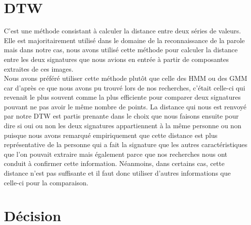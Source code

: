 \documentclass[pdftex,12pt,a4paper]{report}
\begin{document}
\newpage

\chapter{DTW}
C'est une méthode consistant à calculer la distance entre deux séries de valeurs. Elle est majoritairement utilisé dans le domaine de la reconnaissance de la parole mais dans notre cas, nous avons utilisé cette méthode pour calculer la distance entre les deux signatures que nous avions en entrée à partir de composantes extraites de ces images. \\

Nous avons préféré utiliser cette méthode plutôt que celle des HMM ou des GMM car d'après ce que nous avons pu trouvé lors de nos recherches, c'était celle-ci qui revenait le plus souvent comme la plus efficiente pour comparer deux signatures pouvant ne pas avoir le même nombre de points. La distance qui nous est renvoyé par notre DTW est partis prenante dans le choix que nous faisons ensuite pour dire si oui ou non les deux signatures appartiennent à la même personne ou non puisque nous avons remarqué empiriquement que cette distance est plus représentative de la personne qui a fait la signature que les autres caractéristiques que l'on pouvait extraire mais également parce que nos recherches nous ont conduit à confirmer cette information. Néanmoins, dans certains cas, cette distance n'est pas suffisante et il faut donc utiliser d'autres informations que celle-ci pour la comparaison.

\chapter{Décision}

\newpage
\end{document}
